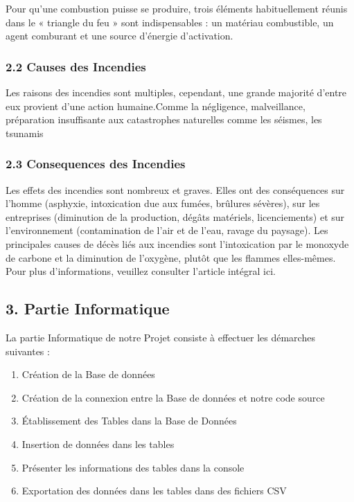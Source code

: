 \documentclass[
]{article}
\providecommand{\tightlist}{%
  \setlength{\itemsep}{0pt}\setlength{\parskip}{0pt}}
\begin{document}
Pour qu'une combustion puisse se produire, trois éléments habituellement
réunis dans le « triangle du feu » sont indispensables : un matériau
combustible, un agent comburant et une source d'énergie d'activation.

\subsubsection{2.2 Causes des Incendies}\label{causes-des-incendies}

Les raisons des incendies sont multiples, cependant, une grande majorité
d'entre eux provient d'une action humaine.Comme la négligence,
malveillance, préparation insuffisante aux catastrophes naturelles comme
les séismes, les tsunamis

\subsubsection{2.3 Consequences des
Incendies}\label{consequences-des-incendies}

Les effets des incendies sont nombreux et graves. Elles ont des
conséquences sur l'homme (asphyxie, intoxication due aux fumées,
brûlures sévères), sur les entreprises (diminution de la production,
dégâts matériels, licenciements) et sur l'environnement (contamination
de l'air et de l'eau, ravage du paysage). Les principales causes de
décès liés aux incendies sont l'intoxication par le monoxyde de carbone
et la diminution de l'oxygène, plutôt que les flammes elles-mêmes. Pour
plus d'informations, veuillez consulter l'article intégral ici.

\subsection{3. Partie Informatique}\label{partie-informatique}

La partie Informatique de notre Projet consiste à effectuer les
démarches suivantes :

\begin{enumerate}
\def\labelenumi{\arabic{enumi}.}
\tightlist
\item
  Création de la Base de données
\item
  Création de la connexion entre la Base de données et notre code source
\item
  Établissement des Tables dans la Base de Données
\item
  Insertion de données dans les tables
\item
  Présenter les informations des tables dans la console
\item
  Exportation des données dans les tables dans des fichiers CSV
\end{enumerate}
\end{document}
